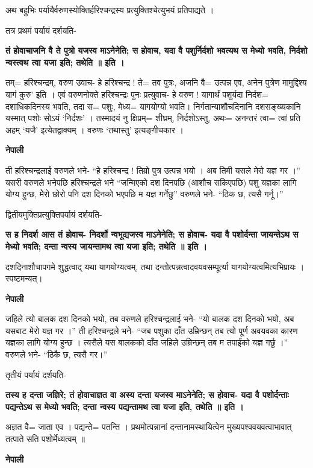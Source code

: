 \documentclass[11pt, a5paper]{article}
\begin{document}
अथ बहुभिः पर्यायैर्वरुणस्योक्तिर्हरिश्चन्द्रस्य प्रत्युक्तिश्चेत्युभयं प्रतिपाद्यते ।

तत्र प्रथमं पर्यायं दर्शयति-

\textbf{तं होवाचाजनि वै ते पुत्रो यजस्व माऽनेनेति; स होवाच, यदा वै पशुर्निर्दशो भवत्यथ स मेध्यो भवति, निर्दशो न्वस्त्वथ त्वा यजा इति; तथेति ॥ इति ।}

तम्= हरिश्चन्द्रम्, वरुण उवाच- हे हरिश्चन्द्र !  ते= तव पुत्रः, अजनि वै= उत्पन्न एव, अनेन पुत्रेण मामुद्दिश्य यागं कुरु’ इति । एवं वरुणनोक्ते हरिश्चन्द्रः पुनः प्रत्युवाच- हे वरुण ! यागार्थं पशुर्यदा निर्दश= दशाधिकदिनस्य भवति, तदा स= पशुः, मेध्य= यागयोग्यो भवति। निर्गतान्याशौचदिनानि दशसङ्‍ख्यकानि यस्मात् पशोः सोऽयं ‘निर्दशः’ । तस्मादयं नु क्षिप्रम्= शीघ्रम्, निर्दशोऽस्तु, अथः= अनन्तरं त्वा= त्वां प्रति अहम् ‘यजै’ इत्येतद्वाक्यम् । वरुणः ‘तथास्तु’ इत्यङ्‍गीचकार ।

\textbf{नेपाली}

ती हरिश्चन्द्रलाई वरुणले भने- “हे हरिश्चन्द्र ! तिम्रो पुत्र उत्पन्न भयो । अब तिमी यसले मेरो यज्ञ गर ।”  यसरी वरुणले भनेपछि  हरिश्चन्द्रले भने “जन्मिएको दश दिनपछि (आशौच सकिएपछि) पशु यज्ञका लागि योग्य हुन्छ, मेेरो छोरो पनि दश दिनको भएपछि म यज्ञ गर्नेछु” वरुणले भने- “ठिक छ, त्यसै गर्नू।”

द्वितीयमुक्तिप्रत्युक्तिपर्यायं दर्शयति-

\textbf{स ह निदर्श आस तं होवाच- निदर्शो न्वभूद्यजस्व माऽनेनेति; स होवाच- यदा वै पशोर्दन्ता जायन्तेऽथ स मेध्यो भवति; दन्ता न्वस्य जायन्तामथ त्वा यजा इति; तथेति ॥ इति ।}

दशदिनाशौचापगमे शुद्धत्वाद् यथा यागयोग्यत्वम्, तथा दन्तोत्पन्नत्वादवयवसम्पूर्त्या यागयोग्यत्वमित्यभिप्रायः । स्पष्टमन्यत्।

\textbf{नेपाली}

जहिले त्यो बालक दश दिनको भयो, तब वरुणले हरिश्चन्द्रलाई भने- “यो बालक दश दिनको भयो, अब यसबाट मेरो यज्ञ गर ।” ती हरिश्चन्द्रले भने- “जब पशुका दाँत उम्रिन्छन् तब त्यो पूर्ण अवयवका कारण यज्ञका लागि योग्य हुन्छ । त्यसैले यस बालकको दाँत जहिले उम्रिन्छन् तब म तपाईंको यज्ञ गर्छु ।” वरुणले भने- “ठिकै छ, त्यसै गर।”

तृतीयं पर्यायं दर्शयति-

\textbf{तस्य ह दन्ता जज्ञिरे; तं होवाचाज्ञत वा अस्य दन्ता यजस्व माऽनेनेति; स होवाच- यदा वै पशोर्दन्ताः पद्यन्तेऽथ स मेध्यो भवति; दन्ता न्वस्य पद्यन्तामथ त्वा यजा इति, तथेति ॥ इति ।}

अज्ञत वै= जाता एव । पद्यन्ते= पतन्ति । प्रथमोत्पन्नानां दन्तानामस्थायित्वेन मुख्यपश्ववयवत्वाभावात् तत्पाते सति पशोर्मेध्यत्वम् ॥

\textbf{नेपाली}
\end{document}
